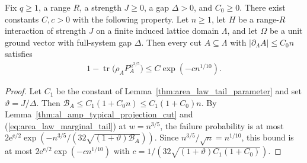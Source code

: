 \begin{lemma}
    \label{thm:al_amp_typical_failure}
    \leanok
    Fix $q\ge1$, a range $R$, a strength $J\ge0$, a gap $\Delta>0$, and
    $C_0\ge0$. There exist constants $C,c>0$ with the following property.
    Let $n\ge1$, let $H$ be a range-$R$ interaction of strength $J$ on a
    finite induced lattice domain $\Lambda$, and let $\Omega$ be a unit
    ground vector with full-system gap $\Delta$. Then every cut
    $A\subseteq\Lambda$ with $|\partial_\Lambda A|\le C_0n$ satisfies
    \begin{align*}
        1-\operatorname{tr}\bigl(\rho_AP_A^{n^{3/5}}\bigr)
        \le C\exp(-cn^{1/10}).
    \end{align*}
\end{lemma}
\begin{proof}\leanok
    Let $C_1$ be the constant of Lemma~\ref{thm:area_law_tail_parameter}
    and set $\vartheta=J/\Delta$. Then
    $\mathcal B_A\le C_1(1+C_0n)\le C_1(1+C_0)n$. By
    Lemma~\ref{thm:al_amp_typical_projection_cut} and
    (\ref{eq:area_law_marginal_tail}) at $w=n^{3/5}$, the failure
    probability is at most
    $2\mathrm e^{\mathrm e/2}\exp(-n^{3/5}/(32\sqrt{(1+\vartheta)\mathcal B_A}))$.
    Since $n^{3/5}/\sqrt{n}=n^{1/10}$, this bound is at most
    $2\mathrm e^{\mathrm e/2}\exp(-cn^{1/10})$ with
    $c=1/(32\sqrt{(1+\vartheta)C_1(1+C_0)})$.
\end{proof}

